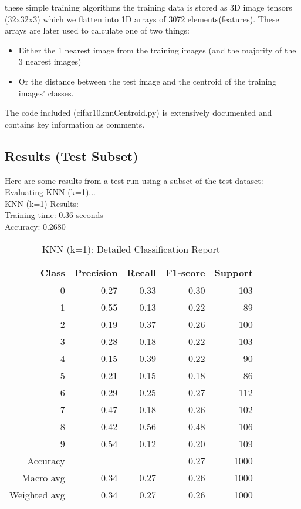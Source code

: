  these simple training algorithms the training data is stored as 3D image tensors (32x32x3) 
which we flatten into 1D arrays of 3072 elements(features). These arrays are later used to calculate 
one of two things:
\begin{itemize}
  \item Either the 1 nearest image from the training images (and the majority of the 3 nearest images)
  \item Or the distance between the test image and the centroid of the training images' classes.
\end{itemize}
The code included (cifar10knnCentroid.py) is extensively documented and contains key information 
as comments. 

\subsection{Results (Test Subset)}
Here are some results from a test run using a subset of the test dataset:\\
Evaluating KNN (k=1)...\\

KNN (k=1) Results:\\
Training time: 0.36 seconds\\
Accuracy: 0.2680
\begin{table}[H]
  \centering
  \begin{tabular}{r r r r r} %
    \toprule
    Class & Precision & Recall & F1-score & Support \\
    \midrule
    0 & 0.27 & 0.33 & 0.30 & 103 \\
    1 & 0.55 & 0.13 & 0.22 & 89 \\
    2 & 0.19 & 0.37 & 0.26 & 100 \\
    3 & 0.28 & 0.18 & 0.22 & 103 \\
    4 & 0.15 & 0.39 & 0.22 & 90 \\
    5 & 0.21 & 0.15 & 0.18 & 86 \\
    6 & 0.29 & 0.25 & 0.27 & 112 \\
    7 & 0.47 & 0.18 & 0.26 & 102 \\
    8 & 0.42 & 0.56 & 0.48 & 106 \\
    9 & 0.54 & 0.12 & 0.20 & 109 \\
    \midrule
    Accuracy & & & 0.27 & 1000 \\
    Macro avg & 0.34 & 0.27 & 0.26 & 1000 \\
    Weighted avg & 0.34 & 0.27 & 0.26 & 1000 \\
    \bottomrule
  \end{tabular}
  \vspace{10pt}
  \caption{KNN (k=1): Detailed Classification Report}
\end{table}

